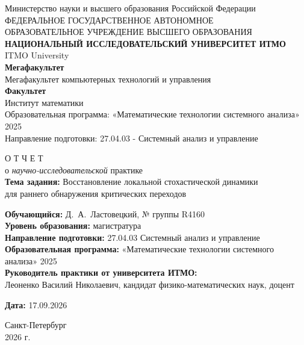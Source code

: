 \documentclass[12pt,a4paper]{article}
\numberwithin{table}{section}
\numberwithin{figure}{section}
\begin{document}
\begingroup
\singlespacing
\begin{titlepage}
\thispagestyle{empty}
\begin{center}
\normalsize
Министерство науки и высшего образования Российской Федерации\\
ФЕДЕРАЛЬНОЕ ГОСУДАРСТВЕННОЕ АВТОНОМНОЕ\\
ОБРАЗОВАТЕЛЬНОЕ УЧРЕЖДЕНИЕ ВЫСШЕГО ОБРАЗОВАНИЯ\\[2mm]
\textbf{НАЦИОНАЛЬНЫЙ ИССЛЕДОВАТЕЛЬСКИЙ УНИВЕРСИТЕТ ИТМО}\\
ITMO University\\[7mm]
\textbf{Мегафакультет}\\
Мегафакультет компьютерных технологий и управления\\
\textbf{Факультет}\\
Институт математики\\[7mm]
Образовательная программа: «Математические технологии системного анализа» 2025\\[3mm]
Направление подготовки: 27.04.03 - Системный анализ и управление
\end{center}

\vspace{13mm}
\begin{center}
{\fontsize{16}{19}\selectfont О Т Ч Е Т}\\[3mm]
о \textit{научно-исследовательской} практике\\[8mm]
\textbf{Тема задания:} Восстановление локальной стохастической динамики\\
для раннего обнаружения критических переходов
\end{center}

\vspace{9mm}
\begin{flushleft}
\textbf{Обучающийся:} Д.~А.~Ластовецкий, № группы R4160\\[3mm]
\textbf{Уровень образования:} магистратура\\[3mm]
\textbf{Направление подготовки:} 27.04.03 Системный анализ и управление\\[3mm]
\textbf{Образовательная программа:} «Математические технологии системного анализа» 2025\\[3mm]
\textbf{Руководитель практики от университета ИТМО:}\\
Леоненко Василий Николаевич, кандидат физико-математических наук, доцент
\end{flushleft}

\vspace{6mm}
\begin{flushright}
\textbf{Дата:} 17.09.2026
\end{flushright}

\vfill
\begin{center}
Санкт-Петербург\\
2026 г.
\end{center}
\end{titlepage}
\endgroup
\setcounter{page}{2}
\end{document}
